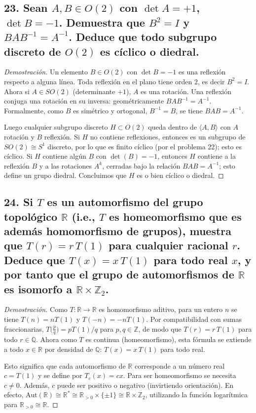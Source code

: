 \documentclass{article}
\begin{document}
\subsection*{23. Sean $A,B\in O(2)$ con $\det A=+1$, $\det B=-1$. Demuestra que $B^2=I$ y $BAB^{-1}=A^{-1}$. Deduce que todo subgrupo discreto de $O(2)$ es cíclico o diedral.}

\begin{proof}[Demostración]
Un elemento $B\in O(2)$ con $\det B=-1$ es una reflexión respecto a alguna línea. Toda reflexión en el plano tiene orden $2$, es decir $B^2=I$. Ahora si $A\in SO(2)$ (determinante $+1$), $A$ es una rotación. Una reflexión conjuga una rotación en su inversa: geométricamente $BAB^{-1}=A^{-1}$. Formalmente, como $B$ es simétrico y ortogonal, $B^{-1}=B$, se tiene $BAB=A^{-1}$.

Luego cualquier subgrupo discreto $H\subset O(2)$ queda dentro de $\langle A,B\rangle$ con $A$ rotación y $B$ reflexión. Si $H$ no contiene reflexiones, entonces es un subgrupo de $SO(2)\cong S^1$ discreto, por lo que es finito cíclico (por el problema 22); esto es cíclico. Si $H$ contiene algún $B$ con $\det(B)=-1$, entonces $H$ contiene a la reflexión $B$ y a las rotaciones $A^k$, cerradas bajo la relación $BAB=A^{-1}$; esto define un grupo diedral. Concluimos que $H$ es o bien cíclico o diedral. 
\end{proof}

\subsection*{24. Si $T$ es un automorfismo del grupo topológico $\mathbb{R}$ (i.e., $T$ es homeomorfismo que es además homomorfismo de grupos), muestra que $T(r)=r\,T(1)$ para cualquier racional $r$. Deduce que $T(x)=x\,T(1)$ para todo real $x$, y por tanto que el grupo de automorfismos de $\mathbb{R}$ es isomorfo a $\mathbb{R}\times\mathbb{Z}_2$.}

\begin{proof}[Demostración]
Como $T:\mathbb{R}\to\mathbb{R}$ es homomorfismo aditivo, para un entero $n$ se tiene $T(n)=nT(1)$ y $T(-n)=-nT(1)$. Por compatibilidad con sumas fraccionarias, $T\bigl(\tfrac{p}{q}\bigr)=pT(1)/q$ para $p,q\in\mathbb{Z}$, de modo que $T(r)=r\,T(1)$ para todo $r\in\mathbb{Q}$. Ahora como $T$ es continua (homeomorfismo), esta fórmula se extiende a todo $x\in\mathbb{R}$ por densidad de $\mathbb{Q}$: $T(x)=x\,T(1)$ para todo real. 

Esto significa que cada automorfismo de $\mathbb{R}$ corresponde a un número real $c=T(1)$ y se define por $T_c(x)=cx$. Para ser homeomorfismo se necesita $c\neq 0$. Además, $c$ puede ser positivo o negativo (invirtiendo orientación). En efecto, $\mathrm{Aut}(\mathbb{R})\cong\mathbb{R}^*\cong \mathbb{R}_{>0}\times\{\pm1\}\cong\mathbb{R}\times\mathbb{Z}_2$, utilizando la función logarítmica para $\mathbb{R}_{>0}\cong\mathbb{R}$. 
\end{proof}
\end{document}
